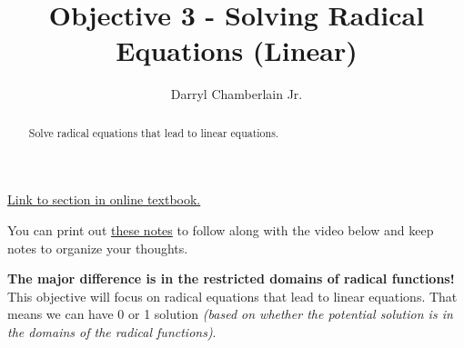 \documentclass{ximera}
\author{Darryl Chamberlain Jr.}
\title{Objective 3 - Solving Radical Equations (Linear)}
\begin{document}
\begin{abstract}
Solve radical equations that lead to linear equations.
\end{abstract}
\maketitle

\href{https://cnx.org/contents/mwjClAV_@8.1:uI1As6DV@15/Other-Types-of-Equations}{Link to section in online textbook.}


You can print out \href{http://people.clas.ufl.edu/dchamberlain31/files/M5-Objective-3-Solving-Radical-Equations-that-Lead-to-Linears.pdf}{these notes} to follow along with the video below and keep notes to organize your thoughts.


\textbf{The major difference is in the restricted domains of radical functions!} This objective will focus on radical equations that lead to linear equations.  That means we can have 0 or 1 solution \textit{(based on whether the potential solution is in the domains of the radical functions)}. 
\end{document}
